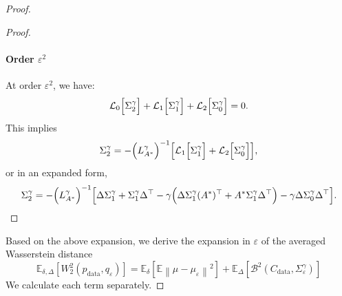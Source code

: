 \documentclass[11pt]{article}
\newcommand{\norm}[1]{\left\|{#1}\right\|}
\newcommand{\EE}{\mathbb{E}}
\begin{document}
\begin{proof}
\begin{proof}
\paragraph{Order \(\varepsilon^2\)}
At order $\varepsilon^2$, we have:
 \begin{align*}
\mathcal{L}_0\Bigl[\Sigma_2^\gamma\Bigr] + \mathcal{L}_1\Bigl[\Sigma_1^\gamma\Bigr] + \mathcal{L}_2\Bigl[\Sigma_0^\gamma\Bigr] = 0.
 \end{align*}
This implies
 \begin{align*}
\Sigma_2^\gamma = -\Bigl(L^\gamma_{A^*}\Bigr)^{-1}\Bigl[
\mathcal{L}_1\Bigl[\Sigma_1^\gamma\Bigr] + \mathcal{L}_2\Bigl[\Sigma_0^\gamma\Bigr]
\Bigr],
 \end{align*}
or in an expanded form,
 \begin{align*}
\Sigma_2^\gamma = -\Bigl(L^\gamma_{A^*}\Bigr)^{-1}\Bigl[
  \Delta  \Sigma_1^\gamma + \Sigma_1^\gamma  \Delta^\top - \gamma\Bigl(\Delta  \Sigma_1^\gamma  (A^*)^\top + A^*  \Sigma_1^\gamma  \Delta^\top\Bigr)
- \gamma   \Delta  \Sigma_0^\gamma  \Delta^\top
\Bigr].
 \end{align*}
\end{proof}
Based on the above expansion, we derive the expansion in $\varepsilon$ of the averaged Wasserstein distance 
\begin{equation*} 
    \EE_{\delta, \Delta} \left[W_2^2(p_\mathrm{data},q_\varepsilon)\right] =   \EE_{\delta} \left[ \EE\norm{\mu - \mu_\varepsilon}^2 \right]+   \EE_{\Delta} \left[ \mathcal{B}^2(C_\mathrm{data}, \Sigma^\gamma_{\varepsilon}) \right]
\end{equation*}
We calculate each term separately.


\end{proof}
\end{document}
